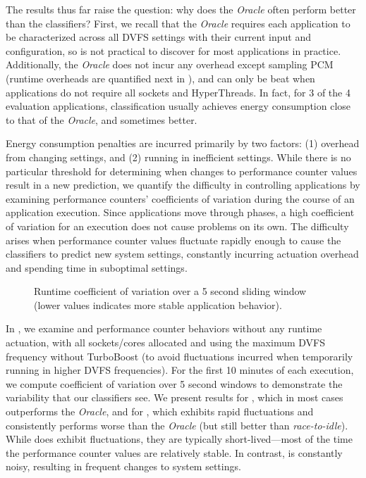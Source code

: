 The results thus far raise the question: why does the \emph{Oracle} often perform better than the classifiers?
First, we recall that the \emph{Oracle} requires each application to be characterized across all DVFS settings with their current input and configuration, so is not practical to discover for most applications in practice.
Additionally, the \emph{Oracle} does not incur any overhead except sampling PCM (runtime overheads are quantified next in ), and can only be beat when applications do not require all sockets and HyperThreads.
In fact, for 3 of the 4 evaluation applications, classification usually achieves energy consumption close to that of the \emph{Oracle}, and sometimes better.

Energy consumption penalties are incurred primarily by two factors: (1) overhead from changing settings, and (2) running in inefficient settings.
While there is no particular threshold for determining when changes to performance counter values result in a new prediction, we quantify the difficulty in controlling applications by examining performance counters' coefficients of variation during the course of an application execution.
Since applications move through phases, a high coefficient of variation for an execution does not cause problems on its own.
The difficulty arises when performance counter values fluctuate rapidly enough to cause the classifiers to predict new system settings, constantly incurring actuation overhead and spending time in suboptimal settings.

\begin{figure}[t]
  \centering
  
  \caption{Runtime coefficient of variation over a 5 second sliding window (lower values indicates more stable application behavior).}
  \label{fig:cv}
\end{figure}

In , we examine  and  performance counter behaviors without any runtime actuation, with all sockets/cores allocated and using the maximum DVFS frequency without TurboBoost (to avoid fluctuations incurred when temporarily running in higher DVFS frequencies).
For the first 10 minutes of each execution, we compute coefficient of variation over 5 second windows to demonstrate the variability that our classifiers see.
We present results for , which in most cases outperforms the \emph{Oracle}, and for , which exhibits rapid fluctuations and consistently performs worse than the \emph{Oracle} (but still better than \emph{race-to-idle}).
While  does exhibit fluctuations, they are typically short-lived---most of the time the performance counter values are relatively stable.
In contrast,  is constantly noisy, resulting in frequent changes to system settings.

